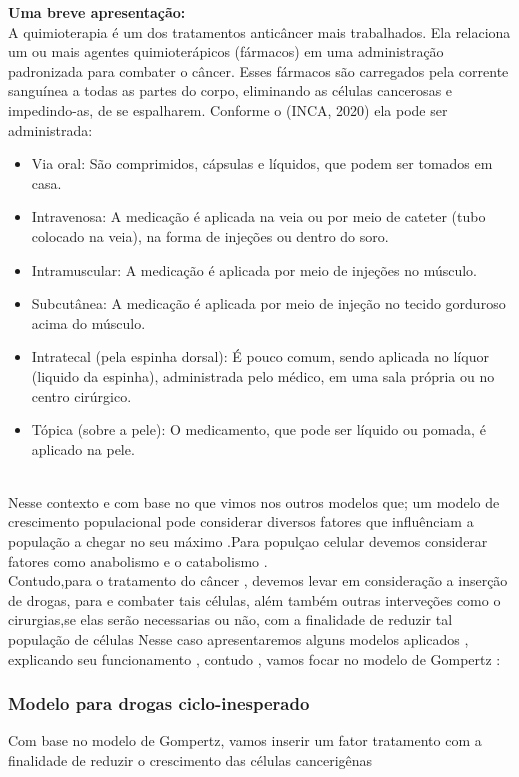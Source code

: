 \textbf{Uma breve apresentação:}
\\
A quimioterapia é um dos tratamentos anticâncer mais trabalhados. Ela relaciona um ou mais agentes quimioterápicos (fármacos) em uma administração padronizada para combater o câncer. Esses fármacos são carregados pela corrente sanguínea a todas as partes do corpo, eliminando as células cancerosas e impedindo-as, de se espalharem. Conforme o (INCA, 2020) ela pode ser administrada:
\begin{itemize}
    \item Via oral: São comprimidos, cápsulas e líquidos, que podem ser tomados em casa.
    \item Intravenosa: A medicação é aplicada na veia ou por meio de cateter (tubo colocado na veia), na forma de injeções ou dentro do soro.
    \item Intramuscular: A medicação é aplicada por meio de injeções no músculo.
    \item Subcutânea: A medicação é aplicada por meio de injeção no tecido gorduroso acima do músculo.
    \item Intratecal (pela espinha dorsal): É pouco comum, sendo aplicada no líquor (liquido da espinha), administrada pelo médico, em uma sala própria ou no centro cirúrgico.
    \item Tópica (sobre a pele): O medicamento, que pode ser líquido ou pomada, é aplicado na pele.
\end{itemize}

\\
  Nesse contexto e com base no que vimos nos outros modelos que; um modelo de crescimento populacional pode considerar diversos fatores que influênciam a população a chegar no seu máximo .Para populçao celular devemos considerar fatores como  anabolismo e o catabolismo .\\
 Contudo,para o tratamento do câncer , devemos levar em consideração a inserção de drogas, para e combater tais células, além também outras interveções como o cirurgias,se elas serão necessarias ou não, com a finalidade de reduzir tal população de células
 Nesse caso apresentaremos alguns modelos aplicados , explicando seu funcionamento , contudo , vamos focar no modelo de Gompertz :

\newpage
\subsubsection{Modelo para drogas ciclo-inesperado}
 Com base no modelo de Gompertz, vamos inserir um fator  tratamento  com a finalidade de reduzir o crescimento das células cancerigênas
 
